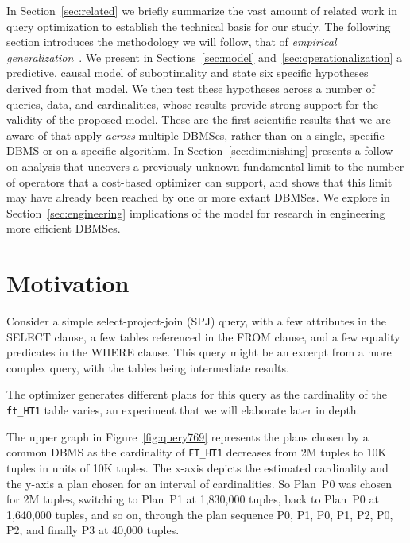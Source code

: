 \documentclass[prodmode,acmtods]{acmsmall}
\begin{document}
In Section~\ref{sec:related} we briefly summarize the vast amount of related
work in query optimization to establish the technical basis for our study.
The following section introduces the methodology we will follow, that of
{\em empirical generalization}~\cite{cohenbook}. We present in
Sections~\ref{sec:model} and~\ref{sec:operationalization} a predictive,
causal model of suboptimality and state six specific hypotheses derived
from that model. We then test these hypotheses across a number of queries,
data, and cardinalities, whose results provide strong support for the
validity of the proposed model.  These are the first scientific results that
we are aware of that apply {\em across} multiple \hbox{DBMSes}, rather than on a
single, specific \hbox{DBMS} or on a specific algorithm. In
Section~\ref{sec:diminishing} presents a follow-on analysis that
uncovers a previously-unknown fundamental limit to the number of operators that a
cost-based optimizer can support, and shows that this limit may have already
been reached by one or more extant DBMSes.
We explore in Section~\ref{sec:engineering} implications of the model for
research in engineering more efficient \hbox{DBMSes}.

\section{Motivation}\label{sec:motivation}

Consider a simple select-project-join (SPJ) query, with a few attributes in
the SELECT clause, a few tables referenced in the FROM clause,
and a few equality predicates in the WHERE clause. This query might be an
excerpt from a more complex query, with the tables being intermediate
results.

\noindent
\hspace{3ex}{\small\begin{verbatim}
        SELECT t0.id1, t0.id2, t2.id4, t1.id1 
        FROM ft_HT3 t2, ft_HT2 t1, ft_HT1 t0 
        WHERE t2.id4=t1.id1 AND t2.id1=t0.id1
\end{verbatim}
}

\noindent
The optimizer generates
different plans for this query as the cardinality of the {\tt
  ft\_HT1} table varies, an experiment that we will elaborate later in depth.

The upper graph in Figure~\ref{fig:query769} represents the plans chosen by
a common DBMS as the cardinality of {\tt FT\_HT1} decreases from 2M tuples
to 10K tuples in units of 10K tuples. The \hbox{x-axis} depicts the estimated
cardinality and the y-axis  a plan chosen for an interval of
cardinalities. So Plan~P0 was chosen for 2M tuples, switching to Plan~P1 at
1,830,000 tuples, back to Plan~P0 at 1,640,000 tuples, and so on, through
the plan
sequence P0, P1, P0, P1, P2, P0, P2, and finally P3 at 40,000 tuples.
\end{document}
